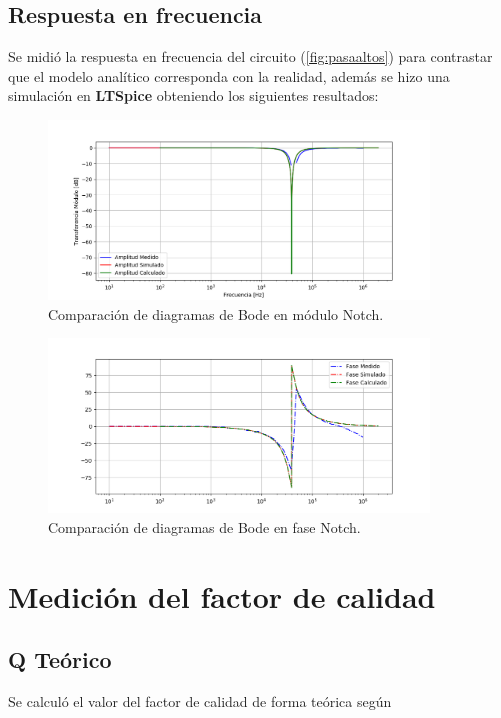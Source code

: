 \subsection{Respuesta en frecuencia}
Se midió la respuesta en frecuencia del circuito (\ref{fig:pasaaltos}) para contrastar que el modelo analítico corresponda con la realidad, además se hizo una simulación en \textbf{LTSpice} obteniendo los siguientes resultados:
\begin{figure}[H]
	\centering
	\includegraphics[width=0.9\textwidth]{Bodes_Labo/Fotos/BR.png}
\caption{Comparación de diagramas de Bode en módulo Notch.}
	\label{fig:BODEBR}
\end{figure}

\begin{figure}[H]
	\centering
	\includegraphics[width=0.9\textwidth]{Bodes_Labo/Fotos/BRP.png}
\caption{Comparación de diagramas de Bode en fase Notch.}
	\label{fig:BODEBRP}
\end{figure}
\section{Medición del factor de calidad}
\subsection{Q Teórico}
Se calculó el valor del factor de calidad de forma teórica según 

